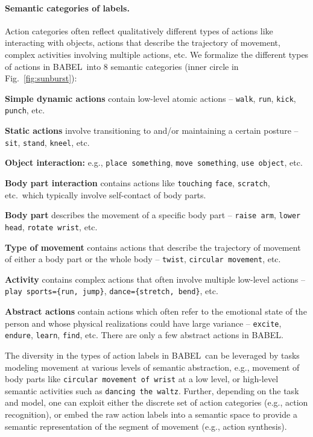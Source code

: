 \documentclass[final]{cvpr}
\def\babel{BABEL}
\begin{document}
\noindent
\paragraph{Semantic categories of labels.}
Action categories often reflect qualitatively different types of actions like interacting with objects, 
actions that describe the trajectory of movement,
complex activities involving multiple actions, etc. 
We formalize the different types of actions in \babel~into $8$ semantic categories (inner circle in Fig.~\ref{fig:sunburst}): 
\begin{compactenum}
    \item \textbf{Simple dynamic actions} contain low-level atomic actions -- \texttt{walk}, \texttt{run}, \texttt{kick}, \texttt{punch}, etc.
    \item \textbf{Static actions} involve transitioning to and/or maintaining a certain posture -- \texttt{sit}, \texttt{stand}, \texttt{kneel}, etc. 
    \item \textbf{Object interaction:} e.g., \texttt{place something}, \texttt{move something}, \texttt{use object}, etc. 
    \item  \textbf{Body part interaction} contains actions like \texttt{touching} \texttt{face}, \texttt{scratch}, etc.~which typically involve self-contact of body parts. 
    \item \textbf{Body part} describes the movement of a specific body part -- \texttt{raise arm}, \texttt{lower head}, \texttt{rotate wrist}, etc. 
    \item \textbf{Type of movement} contains actions that describe the trajectory of movement of either a body part or the whole body -- \texttt{twist}, \texttt{circular movement}, etc.  \item \textbf{Activity} contains complex actions that often involve multiple low-level actions -- \texttt{play sports=\{run, jump\}}, \texttt{dance=\{stretch, bend\}}, etc. 
    \item \textbf{Abstract actions} contain actions which often refer to the emotional state of the person and whose physical realizations could have large variance -- \texttt{excite}, \texttt{endure}, \texttt{learn}, \texttt{find}, etc. There are only a few abstract actions in \babel. 
\end{compactenum}

The diversity in the types of action labels in \babel~can be leveraged by tasks modeling movement at various levels of semantic abstraction, e.g., movement of body parts like \texttt{circular movement of wrist} at a low level, or high-level semantic activities such as \texttt{dancing the waltz}. 
Further, depending on the task and model, one can exploit either the discrete set of action categories (e.g., action recognition), or embed the raw action labels into a semantic space to provide a semantic representation of the segment of movement (e.g., action synthesis). 
\end{document}
